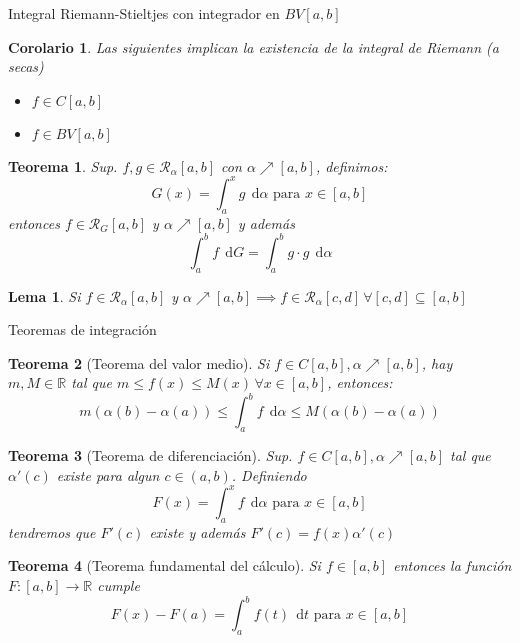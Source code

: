 \documentclass[a4paper]{article}\usepackage{/home/alonso/Documents/Projects/formularios/styles}
\theoremstyle{mytheoremstyle}
\newtheorem{theorem}{Teorema}
\newtheorem{lemma}{Lema}
\newtheorem{cor}{Corolario}[theorem]
\newcommand{\R}{\mathbb{R}}
\newcommand{\1}{\mathds{1}}
\newcommand{\diff}[1]{\,\mathrm{d}#1}
\begin{document}
\begin{multicols*}{3}
\begin{roundbox}{Integral Riemann-Stieltjes con integrador en $BV[a,b] $}
	\begin{cor}
		Las siguientes implican la existencia de la integral de Riemann (a secas)
		\begin{itemize}
			\item $ f \in C[a,b] $
			\item $ f \in BV[a,b] $
		\end{itemize}
	\end{cor}

	\begin{theorem}
		Sup. $ f, g \in \mathcal{R}_{\alpha}[a,b] $ con $\alpha \nearrow [a,b] $, definimos:
		\[
		G(x) = \int_{a}^{x} g \; \diff{\alpha} \text{ para } x \in [a,b]
		\]
		entonces $ f \in \mathcal{R}_G [a,b] $ y $  \alpha \nearrow [a,b] $ y además
		\[
			\int_{a}^{b} f \; \diff{G} = \int_{a}^{b} g\cdot g  \; \diff{\alpha}
		\]
	\end{theorem}

	\begin{lemma}
	Si $  f \in \mathcal{R}_{\alpha} [a,b] $ y $ \alpha \nearrow [a,b] \implies f \in \mathcal{R}_\alpha [c,d] \, \forall [c,d] \subseteq [a,b]$
	\end{lemma}
\end{roundbox}

\begin{roundbox}{Teoremas de integración}
	\begin{theorem}[Teorema del valor medio]
		Si $  f \in C[a,b], \alpha \nearrow [a,b] $, hay $ m, M \in \mathbb{R}$ tal que $ m \leq f(x) \leq M(x) \, \forall x \in [a,b] $, entonces:
		\[
			m(\alpha(b) - \alpha(a)) \leq \int_{a}^{b} f  \; \diff{\alpha} \leq M (\alpha(b) - \alpha(a))
		\]
	\end{theorem}

	\begin{theorem}[Teorema de diferenciación]
		Sup. $ f \in C[a,b], \alpha \nearrow [a,b] $ tal que $ \alpha'(c) $ existe para algun $ c \in (a,b) $.
		Definiendo
		\[
			F(x) = \int_{a}^{x} f \; \diff{\alpha}  \text{ para } x \in [a,b]
		\]
		tendremos que $ F'(c)  $ existe y además $ F'(c) = f(x) \alpha'(c) $
	\end{theorem}

	\begin{theorem}[Teorema fundamental del cálculo]
		Si $  f \in [a,b] $ entonces la función $ F : [a,b] \to \R  $ cumple
		\[
			F(x) - F(a) = \int_{a}^{b} f(t) \; \diff{t}  \text{ para } x \in [a,b]
		\]
	\end{theorem}


\end{roundbox}
\end{multicols*}
\end{document}
